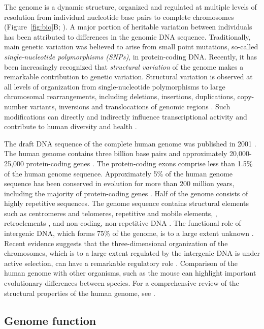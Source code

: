 The genome is a dynamic structure, organized and regulated at multiple
levels of resolution from individual nucleotide base pairs to complete
chromosomes (Figure~\ref{fig:bio}B; \cite{Brown06}). A major portion
of heritable variation between individuals has been attributed to
differences in the genomic DNA sequence. Traditionally, main genetic
variation was believed to arise from small point mutations, so-called
{\it single-nucleotide polymorphisms (SNPs)}, in protein-coding
DNA. Recently, it has been increasingly recognized that {\it
  structural variation} of the genome makes a remarkable contribution to
genetic variation. Structural variation is observed at all levels of
organization from single-nucleotide polymorphisms to large chromosomal
rearrangements, including deletions, insertions, duplications,
copy-number variants, inversions and translocations of genomic regions
\citep{Feuk06, Sharp06}. Such modifications can directly and
indirectly influence transcriptional activity and contribute to human
diversity and health \citep{Collins03, Hurles08}.

The draft DNA sequence of the complete human genome was published in
2001 \citep{Lander01, Venter01}. The human genome contains three
billion base pairs and approximately 20,000-25,000 protein-coding
genes \citep{Collins04}. The protein-coding exons comprise less than
1.5\% of the human genome sequence. Approximately 5\% of the human
genome sequence has been conserved in evolution for more than 200
million years, including the majority of protein-coding genes
\citep{encode07, Waterston02}. Half of the genome consists of highly
repetitive sequences. The genome sequence contains structural elements
such as centromeres and telomeres, repetitive and mobile elements,
\citep{Prak00}, retroelements \citep{Bannert04}, and non-coding,
non-repetitive DNA \citep{Collins03}. The functional role of
intergenic DNA, which forms 75\% of the genome, is to a large extent
unknown \citep{Venter01}. Recent evidence suggests that the
three-dimensional organization of the chromosomes, which is to a large
extent regulated by the intergenic DNA is under active selection, can
have a remarkable regulatory role \citep{Lieberman-Aiden2009,
  Parker2009}. Comparison of the human genome with other organisms,
such as the mouse \citep{Waterston02} can highlight important
evolutionary differences between species. For a comprehensive review
of the structural properties of the human genome, see \cite{Brown06}.


\subsection{Genome function}

